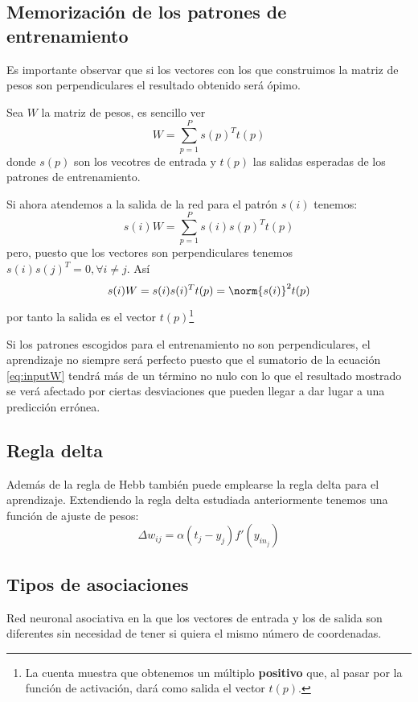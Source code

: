 \subsection{Memorización de los patrones de entrenamiento}

Es importante observar que si los vectores con los que construimos la matriz de pesos son perpendiculares el resultado obtenido será ópimo.

Sea $W$ la matriz de pesos, es sencillo ver
\[W = \sum_{p=1}^Ps(p)^Tt(p)\]
donde $s(p)$ son los vecotres de entrada y $t(p)$ las salidas esperadas de los patrones de entrenamiento.

Si ahora atendemos a la salida de la red para el patrón $s(i)$ tenemos:
\begin{equation}\label{eq:inputW}
s(i)W = \sum_{p=1}^Ps(i)s(p)^Tt(p)
\end{equation}
pero, puesto que los vectores son perpendiculares tenemos $s(i)s(j)^T=0, \forall i\neq j$. Así
\[s(i)W = s(i)s(i)^Tt(p) = \norm{s(i)}^2t(p)\]
por tanto la salida es el vector $t(p)$\footnote{La cuenta muestra que obtenemos un múltiplo \textbf{positivo} que, al pasar por la función de activación, dará como salida el vector $t(p)$.}

\obs Si los patrones escogidos para el entrenamiento no son perpendiculares, el aprendizaje no siempre será perfecto puesto que el sumatorio de la ecuación \ref{eq:inputW} tendrá más de un término no nulo con lo que el resultado mostrado se verá afectado por ciertas desviaciones que pueden llegar a dar lugar a una predicción errónea.


\subsection{Regla delta}
Además de la regla de Hebb también puede emplearse la regla delta para el aprendizaje. Extendiendo la regla delta estudiada anteriormente tenemos una función de ajuste de pesos:
\[Δw_{ij} = α(t_j-y_j)f'(y_{in_j})\]

\subsection{Tipos de asociaciones}
\begin{defn}
Red neuronal asociativa en la que los vectores de entrada y los de salida son diferentes sin necesidad de tener si quiera el mismo número de coordenadas.\\
\end{defn}

